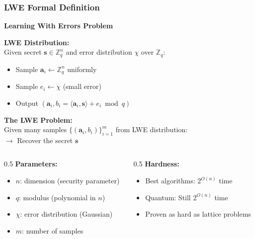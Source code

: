 \documentclass[aspectratio=169,10pt]{beamer}
\newcommand{\teaching}[1]{}
\newcommand{\slideheader}[1]{\frametitle{#1}}
\theoremstyle{plain}
\begin{document}
\begin{frame}
  \slideheader{LWE Formal Definition}
  
  \begin{center}
    \textbf{\large Learning With Errors Problem}
  \end{center}
  
  \vspace{0.3cm}
  
  \begin{blueBox}
    \textbf{LWE Distribution:}\\
    Given secret $\mathbf{s} \in \mathbb{Z}_q^n$ and error distribution $\chi$ over $\mathbb{Z}_q$:
    \begin{itemize}
      \item Sample $\mathbf{a}_i \leftarrow \mathbb{Z}_q^n$ uniformly
      \item Sample $e_i \leftarrow \chi$ (small error)
      \item Output $(\mathbf{a}_i, b_i = \langle \mathbf{a}_i, \mathbf{s} \rangle + e_i \bmod q)$
    \end{itemize}
  \end{blueBox}
  
  \vspace{0.3cm}
  
  \begin{redBox}
    \textbf{The LWE Problem:}\\
    Given many samples $\{(\mathbf{a}_i, b_i)\}_{i=1}^m$ from LWE distribution:\\
    $\rightarrow$ Recover the secret $\mathbf{s}$
  \end{redBox}
  
  \vspace{0.3cm}
  
  \begin{columns}
    \begin{column}{0.5\textwidth}
      \textbf{Parameters:}
      \begin{itemize}
        \item $n$: dimension (security parameter)
        \item $q$: modulus (polynomial in $n$)
        \item $\chi$: error distribution (Gaussian)
        \item $m$: number of samples
      \end{itemize}
    \end{column}
    
    \begin{column}{0.5\textwidth}
      \textbf{Hardness:}
      \begin{itemize}
        \item Best algorithms: $2^{O(n)}$ time
        \item Quantum: Still $2^{O(n)}$ time
        \item Proven as hard as lattice problems
      \end{itemize}
    \end{column}
  \end{columns}
  
  \teaching{Precise mathematical foundation}
\end{frame}
\end{document}
